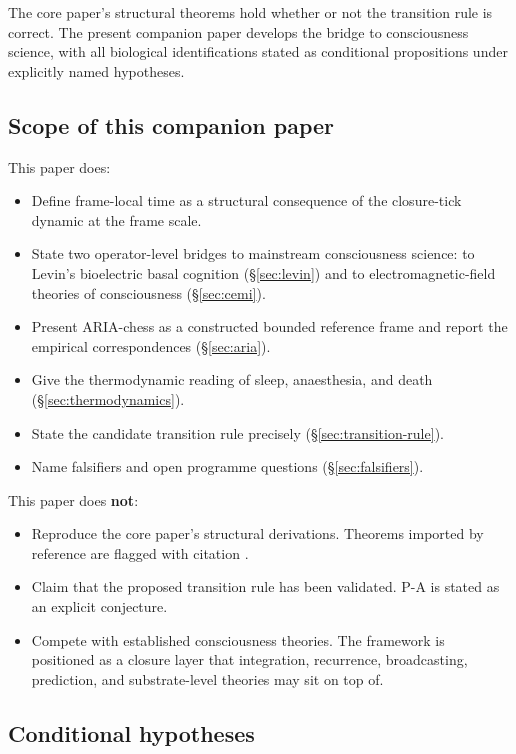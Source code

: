 \documentclass[11pt]{article}
\theoremstyle{plain}
\theoremstyle{definition}
\theoremstyle{remark}
\begin{document}
The core paper's structural theorems hold whether or not the transition rule is correct. The present companion paper develops the bridge to consciousness science, with all biological identifications stated as conditional propositions under explicitly named hypotheses.

\subsection{Scope of this companion paper}

This paper does:
\begin{itemize}[leftmargin=2em]
\item Define frame-local time as a structural consequence of the closure-tick dynamic at the frame scale.
\item State two operator-level bridges to mainstream consciousness science: to Levin's bioelectric basal cognition (\S\ref{sec:levin}) and to electromagnetic-field theories of consciousness (\S\ref{sec:cemi}).
\item Present ARIA-chess as a constructed bounded reference frame and report the empirical correspondences (\S\ref{sec:aria}).
\item Give the thermodynamic reading of sleep, anaesthesia, and death (\S\ref{sec:thermodynamics}).
\item State the candidate transition rule precisely (\S\ref{sec:transition-rule}).
\item Name falsifiers and open programme questions (\S\ref{sec:falsifiers}).
\end{itemize}

This paper does \textbf{not}:
\begin{itemize}[leftmargin=2em]
\item Reproduce the core paper's structural derivations. Theorems imported by reference are flagged with citation \citep{SmartExistenceClosure}.
\item Claim that the proposed transition rule has been validated. P-A is stated as an explicit conjecture.
\item Compete with established consciousness theories. The framework is positioned as a closure layer that integration, recurrence, broadcasting, prediction, and substrate-level theories may sit on top of.
\end{itemize}

\subsection{Conditional hypotheses}
\end{document}

